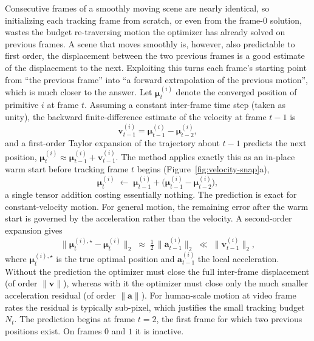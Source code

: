 Consecutive frames of a smoothly moving scene are nearly
identical, so initializing each tracking frame from scratch, or even from the
frame-$0$ solution, wastes the budget re-traversing motion the optimizer has already
solved on previous frames. A scene that moves smoothly is, however, also
predictable to first order, the displacement between the two previous frames is
a good estimate of the displacement to the next. Exploiting this turns each frame's
starting point from \enquote{the previous frame} into \enquote{a forward extrapolation of the
previous motion}, which is much closer to the answer. Let $\boldsymbol{\mu}^{(i)}_t$ denote the converged position of primitive $i$ at frame
$t$. Assuming a constant inter-frame time step (taken as unity), the backward
finite-difference estimate of the velocity at frame $t-1$ is
\begin{equation}
    \mathbf{v}^{(i)}_{t-1} = \boldsymbol{\mu}^{(i)}_{t-1} - \boldsymbol{\mu}^{(i)}_{t-2},
\end{equation}
and a first-order Taylor expansion of the trajectory about $t-1$ predicts the next
position, $\boldsymbol{\mu}^{(i)}_{t} \approx \boldsymbol{\mu}^{(i)}_{t-1} +
\mathbf{v}^{(i)}_{t-1}$. The method applies exactly this as an in-place warm start
before tracking frame $t$ begins (Figure~\ref{fig:velocity-snap}a),
\begin{equation}
    \boldsymbol{\mu}^{(i)}_{t} \;\leftarrow\; \boldsymbol{\mu}^{(i)}_{t-1}
    + \big( \boldsymbol{\mu}^{(i)}_{t-1} - \boldsymbol{\mu}^{(i)}_{t-2} \big),
    \label{eq:velocity}
\end{equation}
a single tensor addition costing essentially nothing. The prediction is exact for
constant-velocity motion. For general motion, the remaining error after the warm start
is governed by the acceleration rather than the velocity. A second-order
expansion gives
\begin{equation}
    \big\| \boldsymbol{\mu}^{(i),\star}_{t} - \boldsymbol{\mu}^{(i)}_{t} \big\|_2
    \;\approx\; \tfrac{1}{2}\,\big\| \mathbf{a}^{(i)}_{t-1} \big\|_2
    \;\ll\; \big\| \mathbf{v}^{(i)}_{t-1} \big\|_2 ,
    \label{eq:accel}
\end{equation}
where $\boldsymbol{\mu}^{(i),\star}_{t}$ is the true optimal position and
$\mathbf{a}^{(i)}_{t-1}$ the local acceleration. Without the prediction the
optimizer must close the full inter-frame displacement (of order $\|\mathbf{v}\|$),
whereas with it the optimizer must close only the much smaller acceleration residual
(of order $\|\mathbf{a}\|$). For human-scale motion at video frame rates the residual
is typically sub-pixel, which justifies the small tracking budget $N_t$. The
prediction begins at frame $t = 2$, the first frame for which two previous positions
exist. On frames $0$ and $1$ it is inactive.

